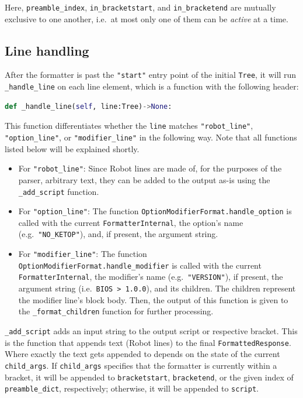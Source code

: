 Here, \verb|preamble_index|, \verb|in_bracketstart|, and \verb|in_bracketend| are mutually exclusive to one another, i.e.\ at most only one of them can be \textit{active} at a time.

\subsection{Line handling}

After the formatter is past the \verb|"start"| entry point of the initial \verb|Tree|, it will run \verb|_handle_line| on each line element, which is a function with the following header:

\begin{lstlisting}[language=Python, caption={Method header of \texttt{_handle_line}.}, label={lst:method_definition_parser_handle_line`'}]
def _handle_line(self, line:Tree)->None:
\end{lstlisting}

This function differentiates whether the \verb|line| matches \verb|"robot_line"|, \verb|"option_line"|, or \verb|"modifier_line"| in the following way. Note that all functions listed below will be explained shortly. 

\begin{itemize}
    \item For \verb|"robot_line"|: Since Robot lines are made of, for the purposes of the parser, arbitrary text, they can be added to the output as-is using the \verb|_add_script| function.
    \item For \verb|"option_line"|: The function \verb|OptionModifierFormat.handle_option| is called with the current \verb|FormatterInternal|, the option's name (e.g.\ \verb|"NO_KETOP"|), and, if present, the argument string.
    \item For \verb|"modifier_line"|: The function \verb|OptionModifierFormat.handle_modifier| is called with the current \verb|FormatterInternal|, the modifier's name (e.g.\ \verb|"VERSION"|), if present, the argument string (i.e.\ \verb|BIOS > 1.0.0|), and its children. The children represent the modifier line's block body. Then, the output of this function is given to the \verb|_format_children| function for further processing.
\end{itemize}

\verb|_add_script| adds an input string to the output script or respective bracket. This is the function that appends text (Robot lines) to the final \verb|FormattedResponse|. Where exactly the text gets appended to depends on the state of the current \verb|child_args|. If \verb|child_args| specifies that the formatter is currently within a bracket, it will be appended to \verb|bracketstart|, \verb|bracketend|, or the given index of \verb|preamble_dict|, respectively; otherwise, it will be appended to \verb|script|.

